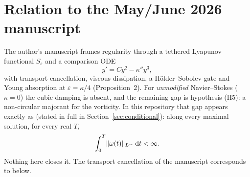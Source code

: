\documentclass[11pt]{article}
\begin{document}
\section{Relation to the May/June 2026 manuscript}
The author's manuscript frames regularity through a tethered Lyapunov functional $S_\varepsilon$ and a comparison ODE
\begin{equation}\label{eq:comparison}
y'=Cy^2-\kappa''y^3,
\end{equation}
with transport cancellation, viscous dissipation, a H\"older--Sobolev gate and Young absorption at $\varepsilon=\kappa/4$ (Proposition~2). For \emph{unmodified} Navier--Stokes ($\kappa=0$) the cubic damping is absent, and the remaining gap is hypothesis (H5): a non-circular majorant for the vorticity. In this repository that gap appears exactly as  (stated in full in Section~\ref{sec:conditional}): along every maximal solution, for every real $T$,
\begin{equation}\label{eq:bkm-int}
\int_0^T\lVert\omega(t)\rVert_{L^\infty}\,\mathrm{d} t<\infty .
\end{equation}
Nothing here closes it. The transport cancellation of the manuscript corresponds to  below.
\end{document}
